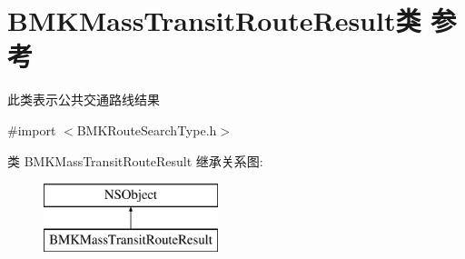 \hypertarget{interface_b_m_k_mass_transit_route_result}{}\section{B\+M\+K\+Mass\+Transit\+Route\+Result类 参考}
\label{interface_b_m_k_mass_transit_route_result}


此类表示公共交通路线结果  




{\ttfamily \#import $<$B\+M\+K\+Route\+Search\+Type.\+h$>$}

类 B\+M\+K\+Mass\+Transit\+Route\+Result 继承关系图\+:\begin{figure}[H]
\begin{center}
\leavevmode
\includegraphics[height=2.000000cm]{interface_b_m_k_mass_transit_route_result}
\end{center}
\end{figure}

